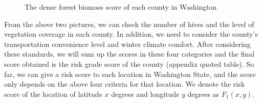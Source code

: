 \documentclass{mcmthesis}
\numberwithin{figure}{section}
\numberwithin{table}{section}
\begin{document}
\begin{figure}[H]
  \caption{The dense forest biomass score of each county in Washington}\label{1_2}
\end{figure}

From the above two pictures, we can check the number of hives and the level of vegetation coverage in each county. In addition, we need to consider the county’s transportation convenience level and winter climate comfort. After considering these standards, we will sum up the scores in these four categories and the final score obtained is the risk grade score of the county (appendix quoted table). So far, we can give a risk score to each location in Washington State, and the score only depends on the above four criteria for that location. We denote the risk score of the location of latitude $x$ degrees and longitude $y$ degrees as $F_1(x,y)$.
\end{document}
